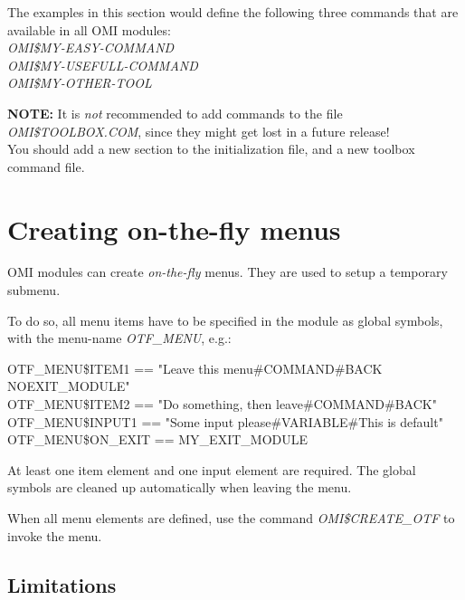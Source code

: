 \documentclass[a4paper]{book}
\newcommand{\vs}{\vspace{3mm}}
\renewcommand{\indent}{\hspace*{5mm}}
\begin{document}
\vs

The examples in this section would define the following three commands that 
are available in all OMI modules: \\
\indent\textsl{OMI{\$}MY-EASY-COMMAND} \\
\indent\textsl{OMI{\$}MY-USEFULL-COMMAND} \\
\indent\textsl{OMI{\$}MY-OTHER-TOOL}

\vs

\hspace{-8mm}\textbf{NOTE:} It is \textit{not} recommended to add commands to the file 
\textsl{OMI{\$}TOOLBOX.COM}, since they might get lost in a future release! \\
You should add a new section to the initialization file, and a new toolbox 
command file.

\chapter{Creating on-the-fly menus}
\label{sec:mylabel2}


OMI modules can create \textit{on-the-fly} menus. They are used to setup a temporary submenu.

To do so, all menu items have to be specified in the module as 
global symbols, with the menu-name \textsl{OTF{\_}MENU}, e.g.: \\
\begin{small}
\begin{texttt}
\indent{\$} OTF{\_}MENU{\$}ITEM1 == "Leave this menu{\#}COMMAND{\#}BACK NOEXIT{\_}MODULE" \\
\indent{\$} OTF{\_}MENU{\$}ITEM2 == "Do something, then leave{\#}COMMAND{\#}BACK" \\
\indent{\$} OTF{\_}MENU{\$}INPUT1 == "Some input please{\#}VARIABLE{\#}This is default" \\
\indent{\$} OTF{\_}MENU{\$}ON{\_}EXIT == MY{\_}EXIT{\_}MODULE \\
\end{texttt}
\end{small}

\vs

At least one item element and one input element are required.
The global symbols are cleaned up automatically when leaving the menu.

When all menu elements are defined, use the command \textsl{OMI{\$}CREATE{\_}OTF} to 
invoke the menu.

\section{Limitations}
\label{subsec:limitationsnu}
\end{document}
